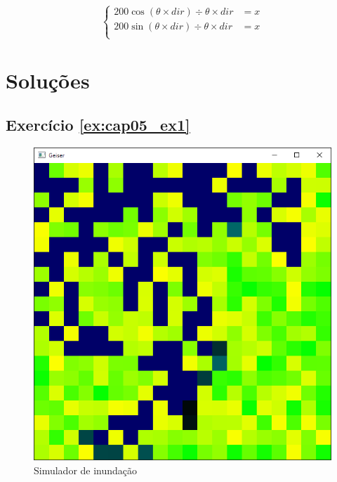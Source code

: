 \begin{enumerate}
\begin{itemize}
  	\begin{equation}\label{eq:cap05_ex3_2}
  	\left\{\begin{matrix}
	 200 \cos(\theta \times dir)\div \theta\times dir & = x \\ 
	 200 \sin(\theta \times dir)\div \theta\times dir & = x \\ 
	\end{matrix}\right.
  	\end{equation}

  \end{itemize}
\label{ex:cap05_ex3}
\end{enumerate}

\section*{Soluções}

\subsection*{Exercício \ref{ex:cap05_ex1} }
\begin{figure}[ht]
  \centerline{\includegraphics[width=.5\textwidth]{img/cap5_ex18.png}}
  \caption{Simulador de inundação}
  \label{fig:cap04_ex1}
\end{figure}


